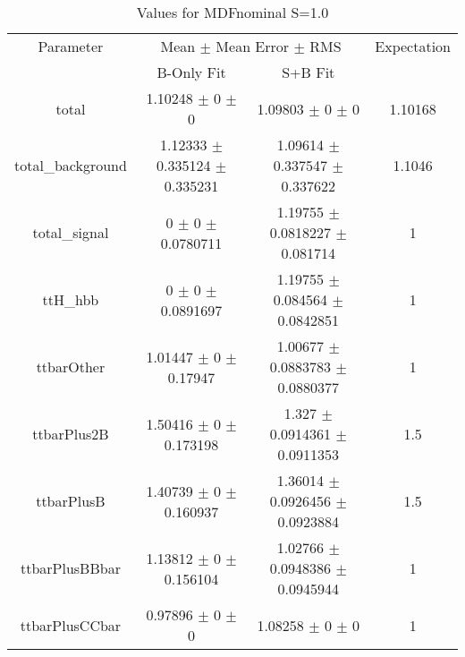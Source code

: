 \begin{table}
\centering
\caption{Values for MDFnominal S=1.0}
\begin{tabular}{cccc}
\toprule
Parameter & \multicolumn{2}{c}{Mean $\pm$ Mean Error $\pm$ RMS} & Expectation\\
 & B-Only Fit & S+B Fit & \\
\midrule
total & \num{1.10248} $\pm$ \num{0} $\pm$ \num{0} & \num{1.09803} $\pm$ \num{0} $\pm$ \num{0} & \num{1.10168}\\
total\_background & \num{1.12333} $\pm$ \num{0.335124} $\pm$ \num{0.335231} & \num{1.09614} $\pm$ \num{0.337547} $\pm$ \num{0.337622} & \num{1.1046}\\
total\_signal & \num{0} $\pm$ \num{0} $\pm$ \num{0.0780711} & \num{1.19755} $\pm$ \num{0.0818227} $\pm$ \num{0.081714} & \num{1}\\
ttH\_hbb & \num{0} $\pm$ \num{0} $\pm$ \num{0.0891697} & \num{1.19755} $\pm$ \num{0.084564} $\pm$ \num{0.0842851} & \num{1}\\
ttbarOther & \num{1.01447} $\pm$ \num{0} $\pm$ \num{0.17947} & \num{1.00677} $\pm$ \num{0.0883783} $\pm$ \num{0.0880377} & \num{1}\\
ttbarPlus2B & \num{1.50416} $\pm$ \num{0} $\pm$ \num{0.173198} & \num{1.327} $\pm$ \num{0.0914361} $\pm$ \num{0.0911353} & \num{1.5}\\
ttbarPlusB & \num{1.40739} $\pm$ \num{0} $\pm$ \num{0.160937} & \num{1.36014} $\pm$ \num{0.0926456} $\pm$ \num{0.0923884} & \num{1.5}\\
ttbarPlusBBbar & \num{1.13812} $\pm$ \num{0} $\pm$ \num{0.156104} & \num{1.02766} $\pm$ \num{0.0948386} $\pm$ \num{0.0945944} & \num{1}\\
ttbarPlusCCbar & \num{0.97896} $\pm$ \num{0} $\pm$ \num{0} & \num{1.08258} $\pm$ \num{0} $\pm$ \num{0} & \num{1}\\
\bottomrule
\end{tabular}
\end{table}